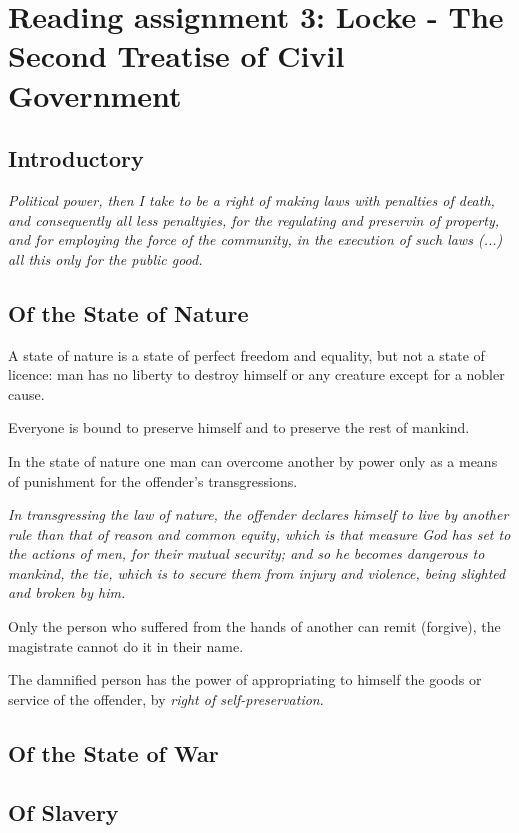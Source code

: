 \section{Reading assignment 3: Locke - The Second Treatise of Civil
Government}

\subsection{Introductory}

\textit{Political power, then I take to be a right of making laws with
penalties of death, and consequently all less penaltyies, for the regulating
and preservin of property, and for employing the force of the community, in
the execution of such laws (...) all this only for the public good.}

\subsection{Of the State of Nature}

A state of nature is a state of perfect freedom and equality, but not a state
of licence: man has no liberty to destroy himself or any creature except for a
nobler cause.

Everyone is bound to preserve himself and to preserve the rest of mankind.

In the state of nature one man can overcome another by power only as a means
of punishment for the offender's transgressions.

\textit{
In transgressing the law of nature, the offender declares himself to live by
another rule than that of reason and common equity, which is that measure God
has set to the actions of men, for their mutual security; and so he becomes
dangerous to mankind, the tie, which is to secure them from injury and
violence, being slighted and broken by him.
}

Only the person who suffered from the hands of another can remit (forgive), 
the magistrate cannot do it in their name.

The damnified person has the power of appropriating to himself the goods or
service of the offender, by \textit{right of self-preservation}.

\subsection{Of the State of War}

\subsection{Of Slavery}

